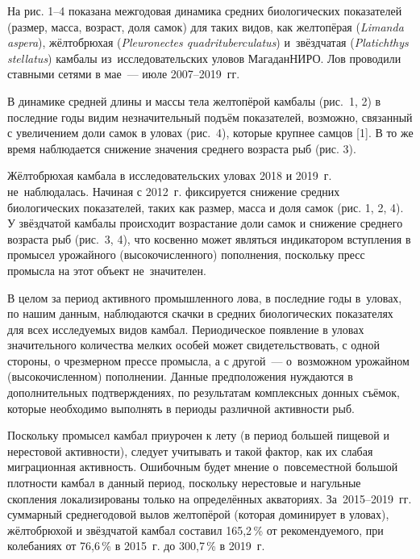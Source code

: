 На рис. 1--4 показана межгодовая динамика средних биологических показателей (размер, масса, возраст, доля самок) для таких видов, как желтопёрая (\textit{Limanda aspera}), жёлтобрюхая (\textit{Pleuronectes quadrituberculatus}) и~звёздчатая (\textit{Platichthys stellatus}) камбалы из~исследовательских уловов МагаданНИРО. Лов проводили ставными сетями в мае~--- июле 2007--2019~гг.
\clearpage





В динамике средней длины и массы тела желтопёрой камбалы (рис.~1, 2) в последние годы видим незначительный подъём показателей, возможно, связанный с увеличением доли самок в уловах (рис. 4), которые крупнее самцов [1]. В то же время наблюдается снижение значения среднего возраста рыб (рис. 3).

Жёлтобрюхая камбала в исследовательских уловах 2018 и 2019~г. не~наблюдалась. Начиная с 2012~г. фиксируется снижение средних биологических показателей, таких как размер, масса и доля самок (рис. 1, 2, 4).
\clearpage
У звёздчатой камбалы происходит возрастание доли самок и снижение среднего возраста рыб (рис. 3, 4), что косвенно может являться индикатором вступления в промысел урожайного (высокочисленного) пополнения, поскольку пресс промысла на этот объект не~значителен.

В целом за период активного промышленного лова, в последние годы в~уловах, по нашим данным, наблюдаются скачки в средних биологических показателях для всех исследуемых видов камбал. Периодическое появление в уловах значительного количества мелких особей может свидетельствовать, с одной стороны, о чрезмерном прессе промысла, а с другой~--- о~возможном урожайном (высокочисленном) пополнении. Данные предположения нуждаются в дополнительных подтверждениях, по результатам комплексных донных съёмок, которые необходимо выполнять в периоды различной активности рыб.

Поскольку промысел камбал приурочен к лету (в период большей пищевой и нерестовой активности), следует учитывать и такой фактор, как их слабая миграционная активность. Ошибочным будет мнение о~повсеместной большой плотности камбал в данный период, поскольку нерестовые и нагульные скопления локализированы только на определённых акваториях. За~2015--2019~гг. суммарный среднегодовой вылов желтопёрой (которая доминирует в уловах), жёлтобрюхой и звёздчатой камбал составил 165,2\,\% от рекомендуемого, при колебаниях от 76,6\,\% в 2015~г. до 300,7\,\% в 2019~г.


